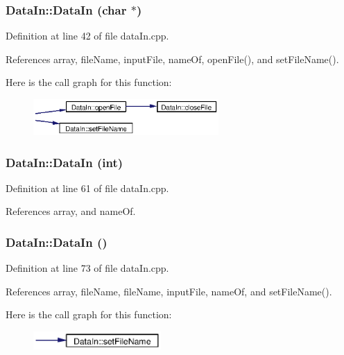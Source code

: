 \subsubsection{\setlength{\rightskip}{0pt plus 5cm}Data\-In::Data\-In (char $\ast$)}\label{classDataIn_a0}




Definition at line 42 of file data\-In.cpp.

References array, file\-Name, input\-File, name\-Of, open\-File(), and set\-File\-Name().

Here is the call graph for this function:\begin{figure}[H]
\begin{center}
\leavevmode
\includegraphics[width=200pt]{classDataIn_a0_cgraph}
\end{center}
\end{figure}
\subsubsection{\setlength{\rightskip}{0pt plus 5cm}Data\-In::Data\-In (int)}\label{classDataIn_a1}




Definition at line 61 of file data\-In.cpp.

References array, and name\-Of.
\subsubsection{\setlength{\rightskip}{0pt plus 5cm}Data\-In::Data\-In ()}\label{classDataIn_a2}




Definition at line 73 of file data\-In.cpp.

References array, file\-Name, file\-Name, input\-File, name\-Of, and set\-File\-Name().

Here is the call graph for this function:\begin{figure}[H]
\begin{center}
\leavevmode
\includegraphics[width=138pt]{classDataIn_a2_cgraph}
\end{center}
\end{figure}
